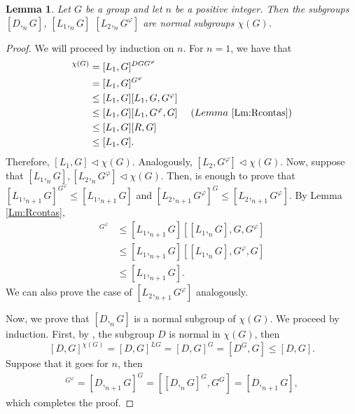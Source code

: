 \documentclass[12pt,leqno]{amsart}
\newtheorem{lem}[theorem]{\sc Lemma}
\begin{document}
\begin{lem}\label{[L_1,G]normal} Let $G$ be a group and let $n$ be a positive integer. Then the subgroups $[D,_nG]$, $[L_1,_nG]$ $[L_2,_nG^{\varphi}]$ are normal subgroups $\chi(G)$. 
\end{lem}
\begin{proof}
We will proceed by induction on $n$. For $n=1$, we have that 
\begin{align*}
    [L_1,G]^{\chi(G)}&= [L_1,G]^{DGG^{\varphi}}\\
    &= [L_1,G]^{G^{\varphi}}\\
    &\leq [L_1,G][L_1,G,G^{\varphi}]\\
    &\leq [L_1,G][L_1,G^{\varphi},G] \ \ \ \ (Lemma \ \ref{Lm:Rcontas})\\
    &\leq [L_1,G][R,G]\\
    &\leq [L_1,G].
 \end{align*}
Therefore, $[L_1,G]\lhd \chi(G)$. Analogously, $[L_2,G^{\varphi}]\lhd\chi(G)$. Now, suppose that $[L_1,_nG],[L_2,_nG^{\varphi}]\lhd \chi(G)$. Then, is enough to prove that $[L_1,_{n+1}G]^{G^{\varphi}}\leq [L_1,_{n+1}G]$ and $ [L_2,_{n+1}G^{\varphi}]^{G}\leq [L_2,_{n+1}G^{\varphi}]$. By Lemma \ref{Lm:Rcontas}, 
    \begin{align*}
        [L_1,_{n+1}G]^{G^{\varphi}}&\leq [L_1,_{n+1}G][[L_1,_{n}G],G,{G^{\varphi}}]\\
        &\leq [L_1,_{n+1}G][[L_1,_{n}G],{G^{\varphi}},G]\\
        &\leq [L_1,_{n+1}G].
    \end{align*}
    We can also prove the case of $[L_2,_{n+1}G^{\varphi}]$ analogously. 
    
Now, we prove that $[D,_nG]$ is a normal subgroup of $\chi(G)$. We proceed by induction. First, by \cite[Lemma 4.1.3]{Sidki}, the subgroup $D$ is normal in $\chi(G)$, then
 \[
     [D,G]^{\chi(G)}= [D,G]^{LG}
     = [D,G]^{G}
     = [D^G,G]
     \leq [D,G].
\]
Suppose that it goes for $n$, then 
    \begin{align*}
        [D,_{n+1}G]^{G^{\varphi}}=[D,_{n+1}G]^{G}=\left[[D,_{n}G]^{G},G^{G}\right]=[D,_{n+1}G],
    \end{align*}
which completes the proof. 
\end{proof}
\end{document}
